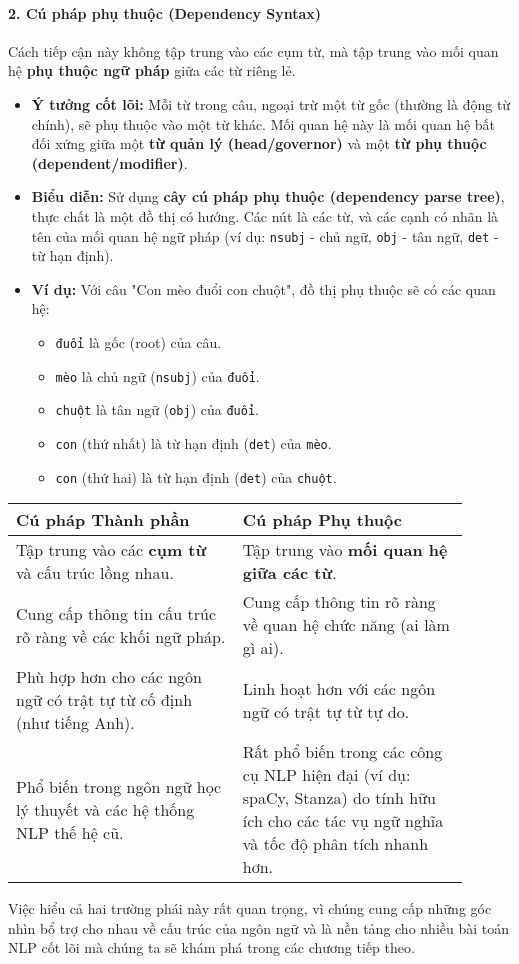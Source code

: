 \paragraph{2. Cú pháp phụ thuộc (Dependency Syntax)}
Cách tiếp cận này không tập trung vào các cụm từ, mà tập trung vào mối quan hệ \textbf{phụ thuộc ngữ pháp} giữa các từ riêng lẻ.
\begin{itemize}
    \item \textbf{Ý tưởng cốt lõi:} Mỗi từ trong câu, ngoại trừ một từ gốc (thường là động từ chính), sẽ phụ thuộc vào một từ khác. Mối quan hệ này là mối quan hệ bất đối xứng giữa một \textbf{từ quản lý (head/governor)} và một \textbf{từ phụ thuộc (dependent/modifier)}.
    \item \textbf{Biểu diễn:} Sử dụng \textbf{cây cú pháp phụ thuộc (dependency parse tree)}, thực chất là một đồ thị có hướng. Các nút là các từ, và các cạnh có nhãn là tên của mối quan hệ ngữ pháp (ví dụ: \texttt{nsubj} - chủ ngữ, \texttt{obj} - tân ngữ, \texttt{det} - từ hạn định).
    \item \textbf{Ví dụ:} Với câu "Con mèo đuổi con chuột", đồ thị phụ thuộc sẽ có các quan hệ:
    
    \begin{itemize}
        \item \texttt{đuổi} là gốc (root) của câu.
        \item \texttt{mèo} là chủ ngữ (\texttt{nsubj}) của \texttt{đuổi}.
        \item \texttt{chuột} là tân ngữ (\texttt{obj}) của \texttt{đuổi}.
        \item \texttt{con} (thứ nhất) là từ hạn định (\texttt{det}) của \texttt{mèo}.
        \item \texttt{con} (thứ hai) là từ hạn định (\texttt{det}) của \texttt{chuột}.
    \end{itemize}
\end{itemize}

\begin{tcolorbox}[
    title=So sánh Cú pháp Thành phần và Phụ thuộc,
    colback=blue!5!white,
    colframe=blue!50!black,
    fonttitle=\bfseries
]
\begin{tabular}{p{0.45\linewidth} | p{0.45\linewidth}}
    \textbf{Cú pháp Thành phần} & \textbf{Cú pháp Phụ thuộc} \\
    \hline
    Tập trung vào các \textbf{cụm từ} và cấu trúc lồng nhau. & Tập trung vào \textbf{mối quan hệ giữa các từ}. \\
    \hline
    Cung cấp thông tin cấu trúc rõ ràng về các khối ngữ pháp. & Cung cấp thông tin rõ ràng về quan hệ chức năng (ai làm gì ai). \\
    \hline
    Phù hợp hơn cho các ngôn ngữ có trật tự từ cố định (như tiếng Anh). & Linh hoạt hơn với các ngôn ngữ có trật tự từ tự do. \\
    \hline
    Phổ biến trong ngôn ngữ học lý thuyết và các hệ thống NLP thế hệ cũ. & Rất phổ biến trong các công cụ NLP hiện đại (ví dụ: spaCy, Stanza) do tính hữu ích cho các tác vụ ngữ nghĩa và tốc độ phân tích nhanh hơn. \\
\end{tabular}
\end{tcolorbox}

Việc hiểu cả hai trường phái này rất quan trọng, vì chúng cung cấp những góc nhìn bổ trợ cho nhau về cấu trúc của ngôn ngữ và là nền tảng cho nhiều bài toán NLP cốt lõi mà chúng ta sẽ khám phá trong các chương tiếp theo.